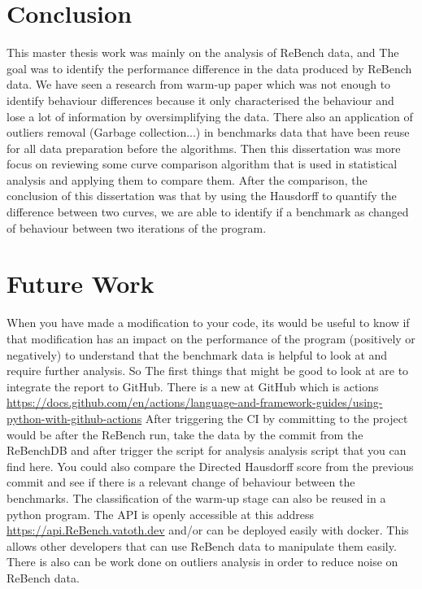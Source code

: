 \documentclass[12pt,a4paper]{article}
\begin{document}
\section{Conclusion}


This master thesis work was mainly on the analysis of ReBench data, and The goal was to identify the performance difference in the data produced by ReBench data. We have seen a research from \citep{barrett2017virtual} warm-up paper which was not enough to identify behaviour differences because it only characterised the behaviour and lose a lot of information by oversimplifying the data. There also an application of outliers removal (Garbage collection...) in benchmarks data that have been reuse for all data preparation before the algorithms.  Then this dissertation was more focus on reviewing some curve comparison algorithm that is used in statistical analysis and applying them to compare them. After the comparison, the conclusion of this dissertation was that by using the Hausdorff to quantify the difference between two curves, we are able to identify if a benchmark as changed of behaviour between two iterations of the program.


\section{Future Work}

When you have made a modification to your code, its would be useful to know if that modification has an impact on the performance of the program (positively or negatively) to understand that the benchmark data is helpful to look at and require further analysis. So The first things that might be good to look at are to integrate the report to GitHub. There is a new  at GitHub which is  actions \url{https://docs.github.com/en/actions/language-and-framework-guides/using-python-with-github-actions}
After triggering the CI by committing to the project would be after the ReBench run, take the data by the commit from the ReBenchDB and after trigger the script for analysis analysis script that you can find here.
You could also compare the Directed Hausdorff score from the previous commit and see if there is a relevant change of behaviour between the benchmarks.  The classification of the warm-up stage can also be reused in a python program.
The API is openly accessible at this address \url{https://api.ReBench.vatoth.dev} and/or can be deployed easily with docker. This allows other developers that can use ReBench data to manipulate them easily.
There is also can be work done on outliers analysis in order to reduce noise on ReBench data.


\end{document}
